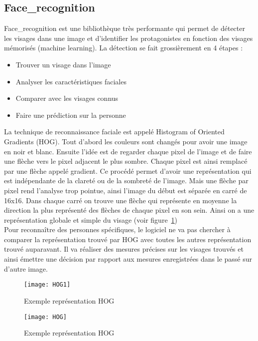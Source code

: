 \subsection{Face\_recognition}
Face\_recognition est une bibliothèque très performante qui permet de détecter
les visages dans une image et d'identifier les protagonistes en fonction des
visages mémorisés (machine learning). La détection se fait grossièrement en
4 étapes :
\begin{itemize}
  \item{Trouver un visage dans l'image}
  \item{Analyser les caractéristiques faciales}
  \item{Comparer avec les visages connus}
  \item{Faire une prédiction sur la personne}
\end{itemize}

La technique de reconnaissance faciale est appelé Histogram of Oriented Gradients
(HOG). Tout d'abord les couleurs sont changés pour avoir une image en noir et blanc.
Ensuite l'idée est de regarder chaque pixel de l'image et de faire une flèche vers
le pixel adjacent le plus sombre. Chaque pixel est ainsi remplacé par une flèche
appelé gradient. Ce procédé permet d'avoir une représentation qui est indépendante
de la clareté ou de la sombreté de l'image. Mais une flèche par pixel rend
l'analyse trop pointue, ainsi l'image du début est séparée en carré de 16x16.
Dans chaque carré on trouve une flèche qui représente en moyenne la direction
la plus représenté des flèches de chaque pixel en son sein. Ainsi on a une
représentation globale et simple du visage (voir figure~\ref{fig:HOG})
\\
Pour reconnaître des personnes spécifiques, le logiciel ne va pas chercher à
comparer la représentation trouvé par HOG avec toutes les autres représentation
trouvé auparavant. Il va réaliser des mesures précises sur les visages trouvés
et ainsi émettre une décision par rapport aux mesures enregistrées dans le passé
sur d'autre image.
\\
\newpage
\begin{figure}[h]\label{fig:HOG}
  \begin{center}
  \texttt{[image: HOG1]}
  \caption{Exemple représentation HOG}
\end{center}
\end{figure}

\begin{figure}[h]\label{fig:HOG1}
  \begin{center}
  \texttt{[image: HOG]}
  \caption{Exemple représentation HOG}
\end{center}
\end{figure}
\newpage
